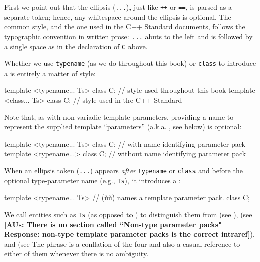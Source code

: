 First we point out that the ellipsis (\lstinline!...!), just like
\lstinline!++! or \lstinline!==!, is parsed as a separate token; hence, any
whitespace around the ellipsis is optional. The common style, and the
one used in the C++ Standard documents, follows the typographic
convention in written prose: \lstinline!...! abuts to the left and is
followed by a single space as in the declaration of \lstinline!C! above.

Whether we use \lstinline!typename! (as we do throughout this book) or
\lstinline!class! to introduce a  is
entirely a matter of style:

\begin{emcppslisting}
template <typename... Ts> class C;  // style used throughout this book
template <class... Ts> class C;     // style used in the C++ Standard
\end{emcppslisting}
    

\noindent Note that, as with non-variadic template parameters, providing a name to
represent the supplied template ``parameters'' (a.k.a. , see below) is optional:

\begin{emcppslisting}
template <typename... Ts> class C;  // with    name identifying parameter pack
template <typename...> class C;     // without name identifying parameter pack
\end{emcppslisting}
    

\noindent When an ellipsis token (\lstinline!...!) appears \emph{after}
\lstinline!typename! or \lstinline!class! and before the optional
type-parameter name (e.g., \lstinline!Ts!), it introduces a
:

\begin{emcppslisting}
template <typename... Ts>  // (ù{}ù) names a template parameter pack.
class C;
\end{emcppslisting}
    

\noindent We call entities such as \lstinline!Ts! 
(as opposed to ) to distinguish them from
 (see ),  (see
 \textbf{[AUs: There is no section called ``Non-type parameter packs"  Response: non-type template parameter packs is the correct intraref]}), and  (see 
The phrase  is a conflation
of the four and also a casual reference to either of them whenever there
is no ambiguity.

